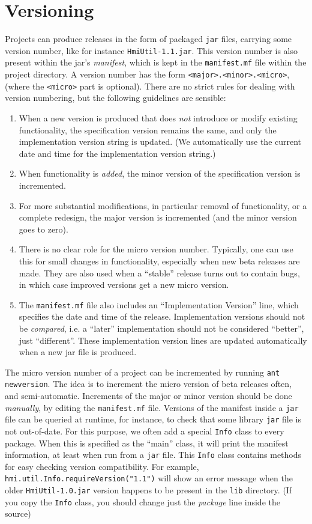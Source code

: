 \section{Versioning}
Projects can produce releases in the form of packaged \verb"jar" files, carrying some
version number, like for instance \verb"HmiUtil-1.1.jar".
This version number is also present within the jar's \emph{manifest}, which is kept
in the \verb"manifest.mf" file within the project directory.
A version number has the form \verb"<major>.<minor>.<micro>", (where the \verb"<micro>" part is optional).
There are no strict rules for dealing with version numbering, but the following guidelines
are sensible:
\begin{enumerate}
\item When a new version is produced that does \emph{not} introduce or modify existing
functionality, the specification version remains the same, and only the implementation version string
is updated. (We automatically use the current date and time for the implementation version string.)
\item When functionality is \emph{added}, the minor version of the specification version is incremented.
\item For more substantial modifications, in particular removal of functionality, or a complete redesign,
the major version is incremented (and the minor version goes to zero).
\item  There is no clear role for the micro version number. Typically, one can use this
for small changes in functionality, especially when new beta releases are made.
They are also used when a ``stable'' release turns out to contain bugs, in which case
improved versions get a new micro version.
\item The \verb"manifest.mf" file also includes an ``Implementation Version'' line,
which specifies the date and time of the release. Implementation versions should not be \emph{compared},
i.e. a ``later'' implementation should not be considered ``better'', just ``different''.
These implementation version lines are updated automatically when a new jar file is produced.
\end{enumerate}

The micro version number of a project can be incremented by running \verb"ant newversion".
The idea is to increment the micro version of beta releases often, and semi-automatic.
Increments of the major or minor version should be done \emph{manually}, by editing the \verb"manifest.mf" file.
Versions of the manifest inside a \verb"jar" file can be queried at runtime, for instance, to check
that some library \verb"jar" file is not out-of-date. For this purpose, we often add a special \verb"Info" class
to every package. When this is specified as the ``main'' class, it will print the manifest
information, at least when run from a \verb"jar" file.
This \verb"Info" class contains methods for easy checking version compatibility.
For example, \verb#hmi.util.Info.requireVersion("1.1")# will show an error message when
the older \verb"HmiUtil-1.0.jar" version happens to be present in the \verb"lib" directory.
(If you copy the \verb"Info" class, you should change just the \emph{package} line inside the source)

